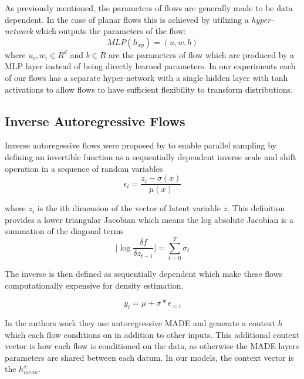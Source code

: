 
As previously mentioned, the parameters of flows are generally made to be data dependent. In the case of planar flows this is achieved by utilizing a \textit{hyper-network} \cite{ha2016hypernets} which outputs the parameters of the flow:
 \begin{equation}
 MLP(h_{xy}) = (u, w, b)
 \end{equation}
 where $u_{i}, w_{i} \in R^{d}$ and $b \in R$ are the parameters of flow which are produced by a \ac{MLP} layer instead of being directly learned parameters. In our experiments each of our flows has a separate hyper-network with a single hidden layer with tanh activations to allow flows to have sufficient flexibility to transform distributions.
 
\subsection{Inverse Autoregressive Flows}

Inverse autoregessive flows were proposed by \citet{kingma2016IAF} to enable parallel sampling by defining an invertible function as a sequentially dependent  inverse scale and shift  operation in a sequence of random variables
\begin{equation}
\epsilon_{i} = \frac{z_{i} - \sigma(x)}{\mu(x)}
\end{equation}

where $z_{i}$ is the ith dimension of the vector of latent variable $z$. This definition provides a lower triangular Jacobian which means the log absolute Jacobian is a summation of the diagonal terms 
\begin{equation}
\bigg| \log \frac{\delta f}{\delta z_{t -1 } } \bigg| = \sum_{t=0}^{T} \sigma_{t}
\end{equation}

The inverse is then defined as sequentially dependent which make these flows computationally expensive for density estimation. 

\begin{equation}
y_{i} = \mu + \sigma * \epsilon_{<i}
\end{equation}

In the authors work they use autoregressive MADE \cite{gregor2015MADE} and generate a context $h$ which each flow conditions on in addition to other inputs. This additional context vector is how each flow is conditioned on the data, as otherwise the MADE layers parameters are shared between each datum. In our models, the context vector is the $h_{mean}^{x}$.







